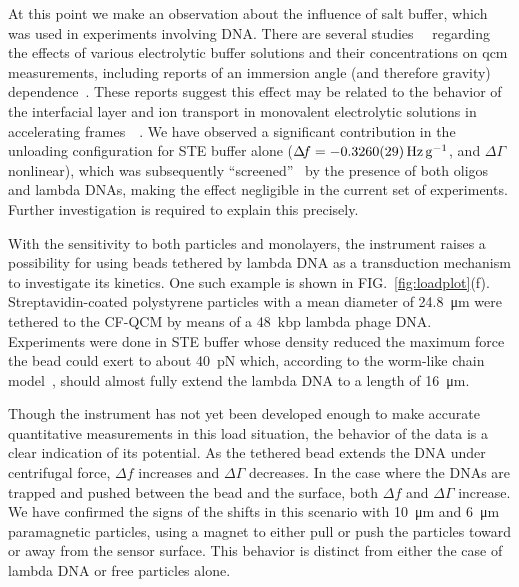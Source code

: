 \documentclass[floatfix,superscriptaddress,a4paper,twocolumn]{revtex4-1}
\newcommand{\Figure}[1]{FIG.~\ref{#1}}
\newcommand{\df}{\Delta\!f}
\newcommand{\dg}{\Delta\Gamma}
\begin{document}
At this point we make an observation about the influence of salt buffer,
which was used in experiments involving DNA.  There are several
studies~\cite{encarnaccao2007influence}~\cite{lin1995role} regarding the
effects of various electrolytic buffer solutions and their concentrations
on \gls{qcm} measurements, including reports of an immersion angle (and therefore
gravity) dependence~\cite{yoshimoto2006characteristics}.  These reports
suggest this effect may be related to the behavior of the interfacial layer
and ion transport in monovalent electrolytic solutions in accelerating
frames~\cite{tolman1911electromotive}~\cite{des1893unpolarisirbare}.  We
have observed a significant contribution in the unloading configuration for
STE buffer alone ($\df=\SI{-0.326+-0.0029}{\hertz\per\g}$, and $\dg$
nonlinear), which was subsequently ``screened''~\cite{zhang2002insulating}
by the presence of both oligos and lambda DNAs, making the effect
negligible in the current set of experiments.  Further investigation is
required to explain this precisely.

With the sensitivity to both particles and monolayers, the instrument
raises a possibility for using beads tethered by lambda DNA as a
transduction mechanism to investigate its kinetics.  One such example is
shown in \Figure{fig:loadplot}(f).  Streptavidin-coated polystyrene
particles with a mean diameter of \SI{24.8}{\micro\meter} were tethered to
the CF-QCM by means of a \SI{48}{kbp} lambda phage DNA.  Experiments were
done in STE buffer whose density reduced the maximum force the bead could
exert to about \SI{40}{\pico\newton} which, according to the worm-like
chain model~\cite{marko1995stretching}, should almost fully extend the
lambda DNA to a length of \SI{16}{\micro\meter}.

Though the instrument has not yet been developed enough to make accurate
quantitative measurements in this load situation, the behavior of the data
is a clear indication of its potential.  As the tethered bead extends the
DNA under centrifugal force, $\df$ increases and $\dg$ decreases.  In the
case where the DNAs are trapped and pushed between the bead and the
surface, both $\df$ and $\dg$ increase.  We have confirmed the signs of the
shifts in this scenario with \SI{10}{\micro\meter} and \SI{6}{\micro\meter}
paramagnetic particles, using a magnet to either pull or push the
particles toward or away from the sensor surface.  This behavior is
distinct from either the case of lambda DNA or free particles alone.
\end{document}
